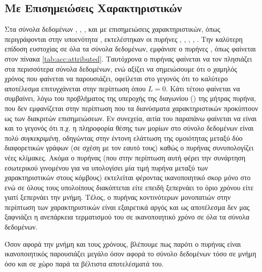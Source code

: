 \subsection{Με Επισημειώσεις Χαρακτηριστικών}
Στα σύνολα δεδομένων , , ,  και  με επισημειώσεις χαρακτηριστικών, όπως περιγράφονται στην υποενότητα \label{ssec:atr}, εκτελέστηκαν οι πυρήνες , , , , .
Την καλύτερη επίδοση ευστοχίας σε όλα τα σύνολα δεδομένων, εμφάνισε ο πυρήνες , όπως φαίνεται στον πίνακα \ref{tab:acc:attributed}.
Ταυτόχρονα ο πυρήνας  φαίνεται να τον πλησιάζει στα περισσότερα σύνολα δεδομένων, ενώ αξίζει να σημειώσουμε ότι ο χαμηλός χρόνος που φαίνεται να παρουσιάζει, οφείλεται στο γεγονός ότι το καλύτερο αποτέλεσμα επιτυγχάνεται στην περίπτωση όπου $L=0$.
Κάτι τέτοιο φαίνεται να συμβαίνει, λόγω του προβλήματος της υπεροχής της διαγωνίου () της μήτρας πυρήνα, που δεν εμφανίζεται στην περίπτωση που τα διανύσματα χαρακτηριστικών προκύπτουν ως  των διακριτών επισημειώσεων.
Εν συνεχεία, αιτία του παραπάνω φαίνεται να είναι και το γεγονός ότι π.χ. η πληροφορία θέσης των μορίων στο σύνολο δεδομένων  είναι πολύ \textit{συγκεκριμένη}, οδηγώντας στην έντονη ελάττωση της ομοιότητας μεταξύ δύο διαφορετικών γράφων (σε σχέση με τον εαυτό τους) καθώς ο πυρήνας συνυπολογίζει νέες κλίμακες.
Ακόμα ο πυρήνας  (που στην περίπτωση αυτή φέρει την συνάρτηση εσωτερικού γινομένου για να υπολογίσει μία τιμή πυρήνα μεταξύ των χαρακτηριστικών στους κόμβους) εκτελείται φέροντας ικανοποιητικό σκορ μόνο στο  ενώ σε όλους τους υπολοίπους διακόπτεται είτε επειδή ξεπερνάει το όριο χρόνου είτε γιατί ξεπερνάει την μνήμη.
Τέλος, ο πυρήνας κοντινότερων μονοπατιών στην περίπτωση των χαρακτηριστικών είναι εξαιρετικά αργός και ως αποτέλεσμα δεν μας ξαφνιάζει η ανεπάρκεια τερματισμού του σε ικανοποιητικό χρόνο σε όλα τα σύνολα δεδομένων.\par
Όσον αφορά την μνήμη και τους χρόνους, βλέπουμε πως παρότι ο πυρήνας  είναι ικανοποιητικός παρουσιάζει μεγάλο  όσον αφορά το σύνολο δεδομένων  τόσο σε μνήμη όσο και σε χώρο παρά τα βέλτιστα αποτελέσματά του.
\newpage
